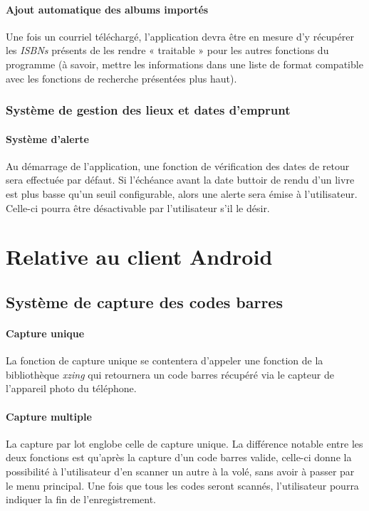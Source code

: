 \paragraph{Ajout automatique des albums importés}
Une fois un courriel téléchargé, l'application devra être en mesure d'y récupérer les \emph{ISBNs} présents de les rendre « traitable » pour les autres fonctions du programme 
(à savoir, mettre les informations dans une liste de format compatible avec les fonctions de recherche présentées plus haut).  

\subsubsection{Système de gestion des lieux et dates d'emprunt}

\paragraph{Système d'alerte}
Au démarrage de l'application, une fonction de vérification des dates de retour sera effectuée par défaut. 
Si l'échéance avant la date buttoir de rendu d'un livre est plus basse qu'un seuil configurable, 
	alors une alerte sera émise à l'utilisateur. 
Celle-ci pourra être désactivable par l'utilisateur s'il le désir. 

\section{Relative au client Android}

\subsection{Système de capture des codes barres}

\paragraph{Capture unique}
La fonction de capture unique se contentera d'appeler une fonction de la bibliothèque \emph{xzing} qui retournera un code barres récupéré via le capteur de l'appareil photo du téléphone.

\paragraph{Capture multiple}
La capture par lot englobe celle de capture unique.
La différence notable entre les deux fonctions est qu'après la capture d'un code barres valide, celle-ci donne la possibilité à l'utilisateur d'en scanner un autre à la volé,
	sans avoir à passer par le menu principal. 
Une fois que tous les codes seront scannés, l'utilisateur pourra indiquer la fin de l'enregistrement. 

